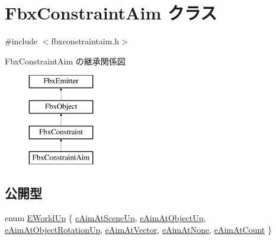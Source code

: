 \hypertarget{class_fbx_constraint_aim}{}\section{Fbx\+Constraint\+Aim クラス}
\label{class_fbx_constraint_aim}


{\ttfamily \#include $<$fbxconstraintaim.\+h$>$}

Fbx\+Constraint\+Aim の継承関係図\begin{figure}[H]
\begin{center}
\leavevmode
\includegraphics[height=4.000000cm]{class_fbx_constraint_aim}
\end{center}
\end{figure}
\subsection*{公開型}
\begin{DoxyCompactItemize}
\item 
enum \hyperlink{class_fbx_constraint_aim_a90316b1564490f5dd0b24e552fe6e637}{E\+World\+Up} \{ \newline
\hyperlink{class_fbx_constraint_aim_a90316b1564490f5dd0b24e552fe6e637ab95495d4f984536c4e6308ed74558281}{e\+Aim\+At\+Scene\+Up}, 
\hyperlink{class_fbx_constraint_aim_a90316b1564490f5dd0b24e552fe6e637a9a5491d58c5255bc7c1a62e6ef7a95c2}{e\+Aim\+At\+Object\+Up}, 
\hyperlink{class_fbx_constraint_aim_a90316b1564490f5dd0b24e552fe6e637abf40447e1656622e38b3e5999aaee85a}{e\+Aim\+At\+Object\+Rotation\+Up}, 
\hyperlink{class_fbx_constraint_aim_a90316b1564490f5dd0b24e552fe6e637a72b5340ebf521ea46e39f3e53b9dbbb9}{e\+Aim\+At\+Vector}, 
\newline
\hyperlink{class_fbx_constraint_aim_a90316b1564490f5dd0b24e552fe6e637a9c547307df4408653e50bc3338a9fcf8}{e\+Aim\+At\+None}, 
\hyperlink{class_fbx_constraint_aim_a90316b1564490f5dd0b24e552fe6e637ad2513eb36142b46f590c27043d713c31}{e\+Aim\+At\+Count}
 \}
\end{DoxyCompactItemize}
